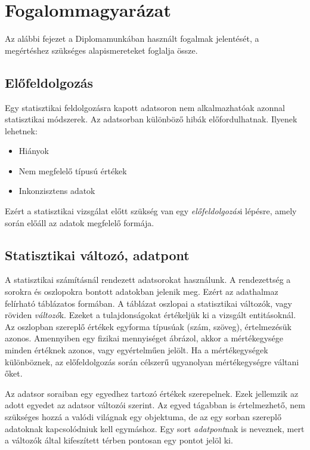 \chapter{Fogalommagyarázat}

Az alábbi fejezet a Diplomamunkában használt fogalmak jelentését, a megértéshez szükséges alapismereteket foglalja össze.

\section{Előfeldolgozás}
Egy statisztikai feldolgozásra kapott adatsoron nem alkalmazhatóak azonnal statisztikai módszerek. Az adatsorban különböző hibák előfordulhatnak. Ilyenek lehetnek:
\begin{itemize}
    \item Hiányok
    \item Nem megfelelő típusú értékek
    \item Inkonzisztens adatok
\end{itemize}
Ezért a statisztikai vizsgálat előtt szükség van egy \emph{előfeldolgozás}i lépésre, amely során előáll az adatok megfelelő formája.

\section{Statisztikai változó, adatpont}
A statisztikai számításnál rendezett adatsorokat használunk. A rendezettség a sorokra és oszlopokra bontott adatokban jelenik meg. Ezért az adathalmaz felírható táblázatos formában. A táblázat oszlopai a statisztikai változók, vagy röviden \emph{változó}k. Ezeket a tulajdonságokat értékeljük ki a vizsgált entitásoknál. Az oszlopban szereplő értékek egyforma típusúak (szám, szöveg), értelmezésük azonos. Amennyiben egy fizikai mennyiséget ábrázol, akkor a mértékegysége minden értéknek azonos, vagy egyértelműen jelölt. Ha a mértékegységek különböznek, az előfeldolgozás során célszerű ugyanolyan mértékegységre váltani őket.

Az adatsor soraiban egy egyedhez tartozó értékek szerepelnek. Ezek jellemzik az adott egyedet az adatsor változói szerint. Az egyed tágabban is értelmezhető, nem szükséges hozzá a valódi világnak egy objektuma, de az egy sorban szereplő adatoknak kapcsolódniuk kell egymáshoz. Egy sort \emph{adatpont}nak is neveznek, mert a változók által kifeszített térben pontosan egy pontot jelöl ki.


